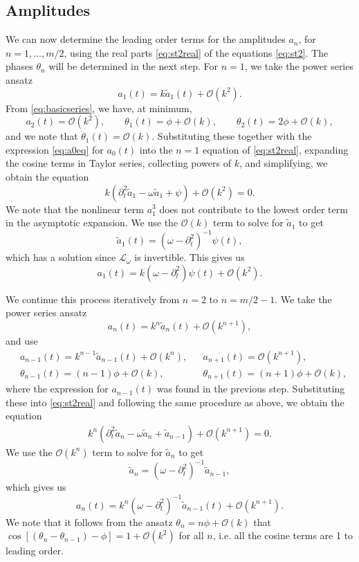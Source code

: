 \documentclass[11pt,reqno]{amsart}
\def\Lw{{\mathcal{L}_\omega}}
\begin{document}
\subsection{Amplitudes}

We can now determine the leading order terms for the amplitudes $a_n$, for $n = 1, \dots, m/2$, using the real parts \cref{eq:st2real} of the equations \cref{eq:st2}. The phases $\theta_n$ will be determined in the next step. For $n=1$, we take the power series ansatz 
\[
a_1(t) = k \tilde{a}_1(t) + \mathcal{O}(k^2).
\]
From \cref{eq:basicseries}, we have, at minimum,
\[
a_2(t) = \mathcal{O}(k^2), \qquad \theta_1(t) = \phi + \mathcal{O}(k), \qquad \theta_2(t) = 2 \phi + \mathcal{O}(k),
\]
and we note that $\dot \theta_1(t) = \mathcal{O}(k)$. Substituting these together with the expression \cref{eq:a0eq} for $a_0(t)$ into the $n=1$ equation of \cref{eq:st2real}, expanding the cosine terms in Taylor series, collecting powers of $k$, and simplifying, we obtain the equation
\[
k\left(\partial_t^2 \tilde{a}_1 - \omega \tilde{a}_1 + \psi\right) + \mathcal{O}(k^2) = 0.
\]
We note that the nonlinear term $a_1^3$ does not contribute to the lowest order term in the asymptotic expansion. We use the $\mathcal{O}(k)$ term to solve for $\tilde{a}_1$ to get 
\begin{equation}\label{eq:a11}
\tilde{a}_1(t) = (\omega - \partial_t^2)^{-1} \psi(t),
\end{equation}
which has a solution since $\Lw$ is invertible. This gives us
\begin{equation}\label{eq:a1eq}
a_1(t) = k (\omega - \partial_t^2) \psi(t) + \mathcal{O}(k^2).
\end{equation}

We continue this process iteratively from $n=2$ to $n=m/2-1$. We take the power series ansatz 
\[
a_n(t) = k^n \tilde{a}_n(t) + \mathcal{O}(k^{n+1}),
\]
and use
\begin{align*}
&a_{n-1}(t) = k^{n-1} \tilde{a}_{n-1}(t) + \mathcal{O}(k^{n}), &&a_{n+1}(t) = \mathcal{O}(k^{n+1}), \\
&\theta_{n-1}(t) = (n-1) \phi + \mathcal{O}(k), &&\theta_{n+1}(t) = (n+1) \phi + \mathcal{O}(k),
\end{align*}
where the expression for $a_{n-1}(t)$ was found in the previous step. Substituting these into \cref{eq:st2real} and following the same procedure as above, we obtain the equation
\begin{align*}
k^n\left(\partial_t^2 \tilde{a}_n - \omega \tilde{a}_n + \tilde{a}_{n-1} \right) +\mathcal{O}(k^{n+1}) = 0.
\end{align*}
We use the $\mathcal{O}(k^n)$ term to solve for $\tilde{a}_n$ to get 
\begin{equation}\label{eq:ann}
\tilde{a}_n = (\omega - \partial_t^2)^{-1}\tilde{a}_{n-1},
\end{equation}
which gives us
\begin{equation}\label{eq:aneq}
a_n(t) = k^n (\omega - \partial_t^2)^{-1} \tilde{a}_{n-1}(t) + \mathcal{O}(k^{n+1}).
\end{equation}
We note that it follows from the ansatz $\theta_n = n \phi + \mathcal{O}(k)$ that $\cos[(\theta_n - \theta_{n-1}) - \phi] = 1 + \mathcal{O}(k^2)$ for all $n$, i.e. all the cosine terms are 1 to leading order. 
\end{document}
